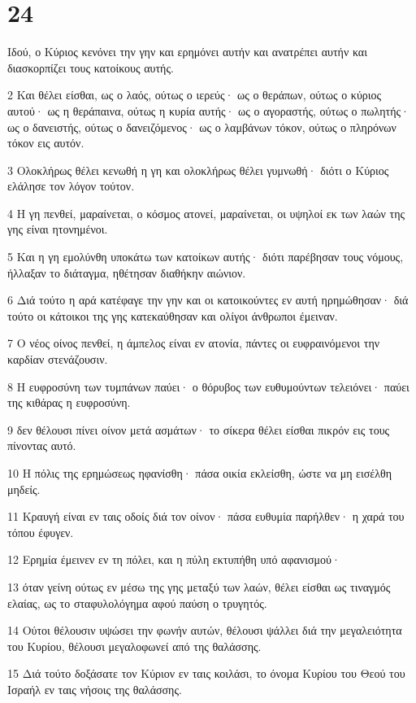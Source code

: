\chapter{24}

\par Ιδού, ο Κύριος κενόνει την γην και ερημόνει αυτήν και ανατρέπει αυτήν και διασκορπίζει τους κατοίκους αυτής.
\par 2 Και θέλει είσθαι, ως ο λαός, ούτως ο ιερεύς· ως ο θεράπων, ούτως ο κύριος αυτού· ως η θεράπαινα, ούτως η κυρία αυτής· ως ο αγοραστής, ούτως ο πωλητής· ως ο δανειστής, ούτως ο δανειζόμενος· ως ο λαμβάνων τόκον, ούτως ο πληρόνων τόκον εις αυτόν.
\par 3 Ολοκλήρως θέλει κενωθή η γη και ολοκλήρως θέλει γυμνωθή· διότι ο Κύριος ελάλησε τον λόγον τούτον.
\par 4 Η γη πενθεί, μαραίνεται, ο κόσμος ατονεί, μαραίνεται, οι υψηλοί εκ των λαών της γης είναι ητονημένοι.
\par 5 Και η γη εμολύνθη υποκάτω των κατοίκων αυτής· διότι παρέβησαν τους νόμους, ήλλαξαν το διάταγμα, ηθέτησαν διαθήκην αιώνιον.
\par 6 Διά τούτο η αρά κατέφαγε την γην και οι κατοικούντες εν αυτή ηρημώθησαν· διά τούτο οι κάτοικοι της γης κατεκαύθησαν και ολίγοι άνθρωποι έμειναν.
\par 7 Ο νέος οίνος πενθεί, η άμπελος είναι εν ατονία, πάντες οι ευφραινόμενοι την καρδίαν στενάζουσιν.
\par 8 Η ευφροσύνη των τυμπάνων παύει· ο θόρυβος των ευθυμούντων τελειόνει· παύει της κιθάρας η ευφροσύνη.
\par 9 δεν θέλουσι πίνει οίνον μετά ασμάτων· το σίκερα θέλει είσθαι πικρόν εις τους πίνοντας αυτό.
\par 10 Η πόλις της ερημώσεως ηφανίσθη· πάσα οικία εκλείσθη, ώστε να μη εισέλθη μηδείς.
\par 11 Κραυγή είναι εν ταις οδοίς διά τον οίνον· πάσα ευθυμία παρήλθεν· η χαρά του τόπου έφυγεν.
\par 12 Ερημία έμεινεν εν τη πόλει, και η πύλη εκτυπήθη υπό αφανισμού·
\par 13 όταν γείνη ούτως εν μέσω της γης μεταξύ των λαών, θέλει είσθαι ως τιναγμός ελαίας, ως το σταφυλολόγημα αφού παύση ο τρυγητός.
\par 14 Ούτοι θέλουσιν υψώσει την φωνήν αυτών, θέλουσι ψάλλει διά την μεγαλειότητα του Κυρίου, θέλουσι μεγαλοφωνεί από της θαλάσσης.
\par 15 Διά τούτο δοξάσατε τον Κύριον εν ταις κοιλάσι, το όνομα Κυρίου του Θεού του Ισραήλ εν ταις νήσοις της θαλάσσης.
